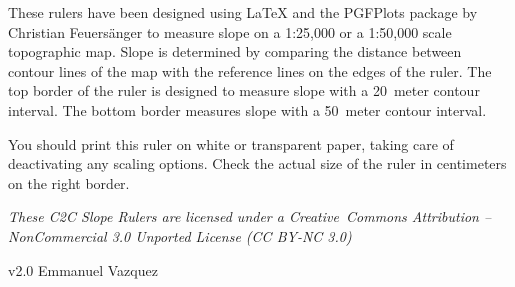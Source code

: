 \documentclass[a4paper,10pt]{article}
\begin{document}
\begin{center}
\end{center}


\vskip 1.0cm
\small

\noindent
These rulers have been designed  using \LaTeX{} and the PGFPlots package
by Christian Feuers\"anger to measure  slope on a 1:25,000 or a 1:50,000
scale  topographic map. Slope  is determined  by comparing  the distance
between contour lines  of the map with the reference  lines on the edges
of the ruler.  The top border  of the ruler is designed to measure slope
with a 20~meter contour interval.  The bottom border measures slope with
a 50~meter contour interval.  \bigskip

\noindent
You should print  this ruler on white or  transparent paper, taking care
of deactivating any scaling options.  Check the actual size of the ruler
in centimeters on the right border. \bigskip

\noindent   \sl  These   C2C   Slope  Rulers   are   licensed  under   a
Creative~Commons Attribution  -- NonCommercial 3.0  Unported License (CC
BY-NC 3.0) \bigskip

\noindent
v2.0 Emmanuel Vazquez
\end{document}
